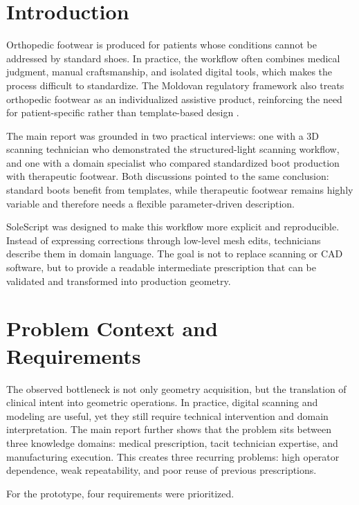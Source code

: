 \documentclass[12pt,a4paper]{article}
\begin{document}
\section{Introduction}
Orthopedic footwear is produced for patients whose conditions cannot be addressed by standard shoes. In practice, the workflow often combines medical judgment, manual craftsmanship, and isolated digital tools, which makes the process difficult to standardize. The Moldovan regulatory framework also treats orthopedic footwear as an individualized assistive product, reinforcing the need for patient-specific rather than template-based design \cite{lege}.

The main report was grounded in two practical interviews: one with a 3D scanning technician who demonstrated the structured-light scanning workflow, and one with a domain specialist who compared standardized boot production with therapeutic footwear. Both discussions pointed to the same conclusion: standard boots benefit from templates, while therapeutic footwear remains highly variable and therefore needs a flexible parameter-driven description.

SoleScript was designed to make this workflow more explicit and reproducible. Instead of expressing corrections through low-level mesh edits, technicians describe them in domain language. The goal is not to replace scanning or CAD software, but to provide a readable intermediate prescription that can be validated and transformed into production geometry.

\section{Problem Context and Requirements}
The observed bottleneck is not only geometry acquisition, but the translation of clinical intent into geometric operations. In practice, digital scanning and modeling are useful, yet they still require technical intervention and domain interpretation. The main report further shows that the problem sits between three knowledge domains: medical prescription, tacit technician expertise, and manufacturing execution. This creates three recurring problems: high operator dependence, weak repeatability, and poor reuse of previous prescriptions.

For the prototype, four requirements were prioritized.
\end{document}
